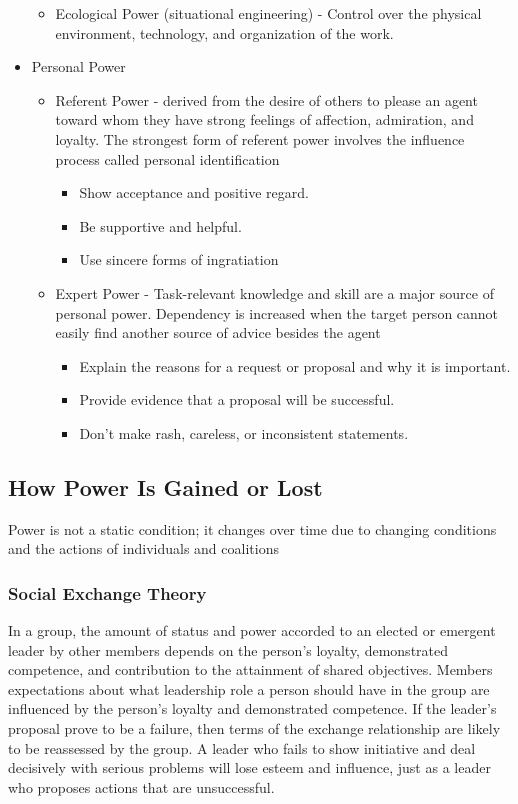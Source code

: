\begin{itemize}
\begin{itemize}
		\item Ecological Power (situational engineering) - Control over the physical environment, technology, and organization of the work.
		\end{itemize}
	\item Personal Power
	\begin{itemize}
		\item Referent Power - derived from the desire of others to please an agent toward whom they have strong feelings of affection, admiration, and loyalty. The strongest form of referent power involves the influence process called personal identification
			\begin{itemize}
				\item Show acceptance and positive regard.
				\item Be supportive and helpful.
				\item Use sincere forms of ingratiation
			\end{itemize}
		\item Expert Power - Task-relevant knowledge and skill are a major source of personal power. Dependency is increased when the target person cannot easily find another source of advice besides the agent
			\begin{itemize}
				\item Explain the reasons for a request or proposal and why it is important.
				\item Provide evidence that a proposal will be successful.
				\item Don’t make rash, careless, or inconsistent statements.
			\end{itemize}
	\end{itemize}
\end{itemize}

\subsection{How Power Is Gained or Lost} %
\label{sub:how_power_is_gained_or_lost}
Power is not a static condition; it changes over time due to changing conditions and the actions of individuals and coalitions

\subsubsection{Social Exchange Theory} %
\label{ssub:social_exchange_theory}
	In a group, the amount of status and power accorded to an elected or emergent leader by other members depends on the person’s loyalty, demonstrated competence, and contribution to the attainment of shared objectives. Members expectations about what leadership role a person should have in the group are influenced by the person’s loyalty and demonstrated competence. If the leader’s proposal prove to be a failure, then terms of the exchange relationship are likely to be reassessed by the group. A leader who fails to show initiative and deal decisively with serious problems will lose esteem and influence, just as a leader who proposes actions that are unsuccessful.


